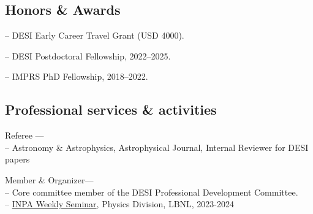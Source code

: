 \documentclass[12pt,letterpaper]{article}
\begin{document}

\subsection{Honors \& Awards}
\begin{list}{}{\cvlist}
  \item -- DESI Early Career Travel Grant (USD 4000).
  \item -- DESI Postdoctoral Fellowship, 2022--2025.
  \item -- IMPRS PhD Fellowship, 2018--2022.
\end{list}


\vspace{-2mm}
\subsection{Professional services \& activities}

\begin{list}{}{\cvlist}
    \item Referee --- \\
    -- Astronomy \& Astrophysics, Astrophysical Journal, Internal Reviewer for DESI papers
    \item Member \& Organizer--- \\
        -- Core committee member of the DESI Professional Development Committee. \\
        -- \href{https://inpa.lbl.gov/events/}{INPA Weekly Seminar}, Physics Division, LBNL, 2023-2024 \\
        \end{list}
  \vspace{-2mm}
\end{document}
